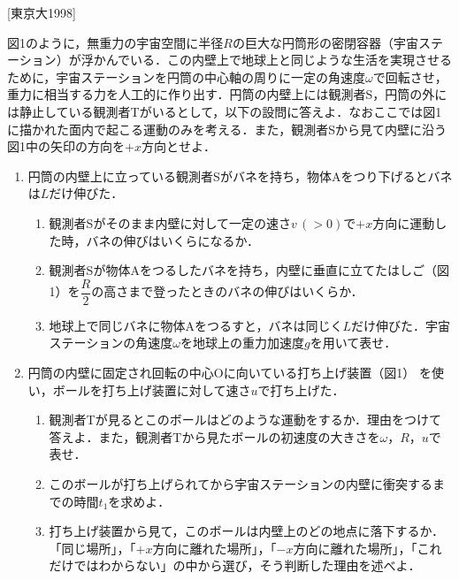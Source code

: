 


\noindent
{} [東京大1998]

図1のように，無重力の宇宙空間に半径$R$の巨大な円筒形の密閉容器（宇宙ステーション）が浮かんでいる．この内壁上で地球上と同じような生活を実現させるために，宇宙ステーションを円筒の中心軸の周りに一定の角速度$\omega$で回転させ，重力に相当する力を人工的に作り出す．円筒の内壁上には観測者S，円筒の外には静止している観測者Tがいるとして，以下の設問に答えよ．なおここでは図1に描かれた面内で起こる運動のみを考える．また，観測者Sから見て内壁に沿う図1中の矢印の方向を$+x$方向とせよ．

\begin{enumerate}[I]
  \item {\hzw}円筒の内壁上に立っている観測者Sがバネを持ち，物体Aをつり下げるとバネは$L$だけ伸びた．
  \begin{enumerate}[(1)]
    \item {\hzw}観測者Sがそのまま内壁に対して一定の速さ$v \, (> 0)$で$+x$方向に運動した時，バネの伸びはいくらになるか．
    \item {\hzw}観測者Sが物体Aをつるしたバネを持ち，内壁に垂直に立てたはしご（図1）を$\dfrac{R}{2}$の高さまで登ったときのバネの伸びはいくらか．
    \item {\hzw}地球上で同じバネに物体Aをつるすと，バネは同じく$L$だけ伸びた．宇宙ステーションの角速度$\omega$を地球上の重力加速度$g$を用いて表せ．
  \end{enumerate}
  \item {\hzw}円筒の内壁に固定され回転の中心Oに向いている打ち上げ装置（図1） を使い，ボールを打ち上げ装置に対して速さ$u$で打ち上げた．
  \begin{enumerate}[(1)]
    \item {\hzw}観測者Tが見るとこのボールはどのような運動をするか．理由をつけて答えよ．また，観測者Tから見たボールの初速度の大きさを$\omega$，$R$，$u$で表せ．
    \item {\hzw}このボールが打ち上げられてから宇宙ステーションの内壁に衝突するまでの時間$t_1$を求めよ．
    \item {\hzw}打ち上げ装置から見て，このボールは内壁上のどの地点に落下するか．「同じ場所」，「$+x$方向に離れた場所」，「$-x$方向に離れた場所」，「これだけではわからない」の中から選び，そう判断した理由を述べよ．
  \end{enumerate}
\end{enumerate}

